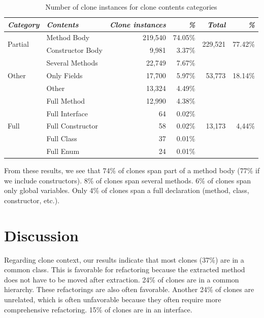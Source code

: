 \documentclass[runningheads]{llncs}
\begin{document}
\begin{table}[H]
\centering
\caption{Number of clone instances for clone contents categories}
\begin{tabular}{@{}l|l|rr|rr@{}}
\toprule
\textit{\textbf{Category}} & \textit{\textbf{Contents}} & \textit{\textbf{Clone instances}} & \textit{\textbf{\%}} & \textit{\textbf{Total}} & \textit{\textbf{\%}} \\ \midrule
\multirow{2}{*}{Partial} & Method Body & 219,540 & 74.05\% & \multirow{2}{*}{229,521}& \multirow{2}{*}{77.42\%} \\ \cmidrule(lr){2-4}
 & Constructor Body & 9,981 & 3.37\% & & \\ \midrule
\multirow{3}{*}{Other} & Several Methods & 22,749 & 7.67\% & \multirow{3}{*}{53,773} & \multirow{3}{*}{18.14\%} \\ \cmidrule(lr){2-4}
 & Only Fields & 17,700 & 5.97\% & & \\ \cmidrule(lr){2-4}
 & Other & 13,324 & 4.49\% & & \\ \midrule
 \multirow{5}{*}{Full} & Full Method & 12,990 & 4.38\% & \multirow{5}{*}{13,173}& \multirow{5}{*}{4,44\%} \\ \cmidrule(lr){2-4}
  & Full Interface & 64 & 0.02\% & & \\ \cmidrule(lr){2-4}
  & Full Constructor & 58 & 0.02\% & & \\ \cmidrule(lr){2-4}
  & Full Class & 37 & 0.01\% & & \\ \cmidrule(lr){2-4}
  & Full Enum & 24 & 0.01\% & & \\ \bottomrule
\end{tabular}
\label{tab:contents}
\end{table}

From these results, we see that 74\% of clones span part of a method body (77\% if we include constructors). 8\% of clones span several methods. 6\% of clones span only global variables. Only 4\% of clones span a full declaration (method, class, constructor, etc.).

\section{Discussion}
Regarding clone context, our results indicate that most clones (37\%) are in a common class. This is favorable for refactoring because the extracted method does not have to be moved after extraction. 24\% of clones are in a common hierarchy. These refactorings are also often favorable. Another 24\% of clones are unrelated, which is often unfavorable because they often require more comprehensive refactoring. 15\% of clones are in an interface.
\end{document}
